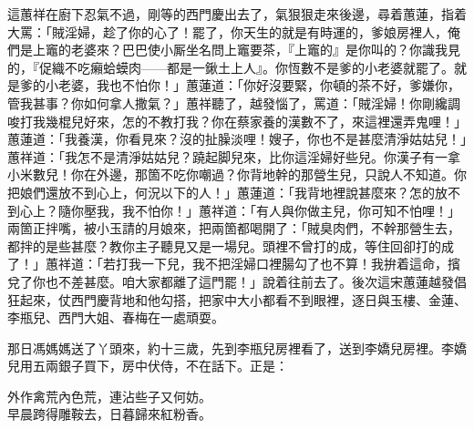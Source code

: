 這蕙祥在廚下忍氣不過，剛等的西門慶出去了，氣狠狠走來後邊，尋着蕙蓮，指着大罵：「賊淫婦，趁了你的心了！罷了，你天生的就是有時運的，爹娘房裡人，俺們是上竈的老婆來？巴巴使小厮坐名問上竈要茶，『上竈的』是你叫的？你識我見的，『促織不吃癩蛤蟆肉——都是一鍬土上人』。你恆數不是爹的小老婆就罷了。就是爹的小老婆，我也不怕你！」蕙蓮道：「你好沒要緊，你頓的茶不好，爹嫌你，管我甚事？你如何拿人撒氣？」蕙祥聽了，越發惱了，罵道：「賊淫婦！你剛纔調唆打我幾棍兒好來，怎的不教打我？你在蔡家養的漢數不了，來這裡還弄鬼哩！」蕙蓮道：「我養漢，你看見來？沒的扯臊淡哩！嫂子，你也不是甚麼清淨姑姑兒！」{}蕙祥道：「我怎不是清淨姑姑兒？蹺起脚兒來，比你這淫婦好些兒。{}你漢子有一拿小米數兒！你在外邊，那箇不吃你嘲過？你背地幹的那營生兒，只說人不知道。你把娘們還放不到心上，何況以下的人！」{}蕙蓮道：「我背地裡說甚麼來？怎的放不到心上？隨你壓我，我不怕你！」蕙祥道：「有人與你做主兒，你可知不怕哩！」兩箇正拌嘴，被小玉請的月娘來，把兩箇都喝開了：「賊臭肉們，不幹那營生去，都拌的是些甚麼？教你主子聽見又是一場兒。頭裡不曾打的成，等住回卻打的成了！」蕙祥道：「若打我一下兒，我不把淫婦口裡腸勾了也不算！我拚着這命，擯兌了你也不差甚麼。咱大家都離了這門罷！」說着往前去了。後次這宋蕙蓮越發倡狂起來，仗西門慶背地和他勾搭，把家中大小都看不到眼裡，逐日與玉樓、金蓮、李瓶兒、西門大姐、春梅在一處頑耍。

那日馮媽媽送了丫頭來，約十三歲，先到李瓶兒房裡看了，送到李嬌兒房裡。李嬌兒用五兩銀子買下，房中伏侍，不在話下。正是：

\begin{myquote} 
外作禽荒內色荒，連沾些子又何妨。\\早晨跨得雕鞍去，日暮歸來紅粉香。
\end{myquote} 


